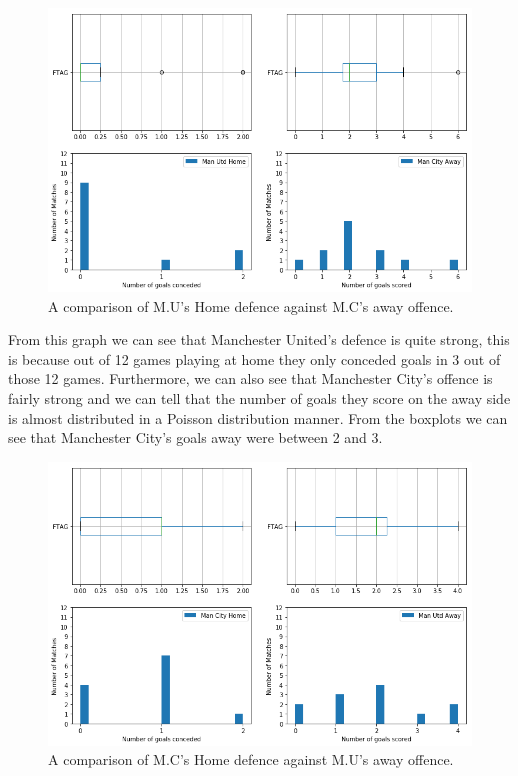 \documentclass[11pt]{report}
\begin{document}
\begin{figure}[ht]
  \centering
      \includegraphics[width=1\textwidth]{fig1}
  \caption{A comparison of M.U's Home defence against M.C's away offence.}
\end{figure}
\vspace{0.3cm}

\noindent
From this graph we can see that Manchester United's defence is quite strong, this is because out of 12 games playing at home they only conceded goals in 3 out of those 12 games. Furthermore, we can also see that Manchester City's offence is fairly strong and we can tell that the number of goals they score on the away side is almost distributed in a Poisson distribution manner. From the boxplots we can see that Manchester City's goals away were between 2 and 3. 

\newpage
\begin{figure}[ht]
  \centering
      \includegraphics[width=1\textwidth]{fig2}
  \caption{A comparison of M.C's Home defence against M.U's away offence.}
\end{figure}
\end{document}
